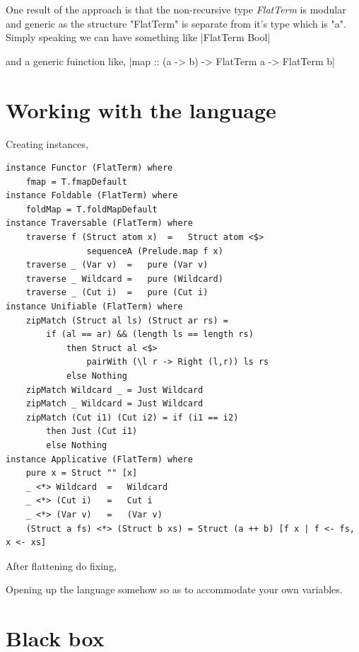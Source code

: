\documentclass[thesis-solanki.tex]{subfiles}
\begin{document}
One result of the approach is that the non-recursive type \textit{FlatTerm} is modular and generic as the structure "FlatTerm" is separate 
from it's type which is "a". Simply speaking we can have something like 
|FlatTerm Bool|

and a generic fuinction like,
|map :: (a -> b) -> FlatTerm a -> FlatTerm b|


\section{Working with the language}
Creating instances,
\begin{verbatim}
instance Functor (FlatTerm) where
	fmap = T.fmapDefault
instance Foldable (FlatTerm) where
 	foldMap = T.foldMapDefault
instance Traversable (FlatTerm) where
  	traverse f (Struct atom x)	=	Struct atom <$> 
  				sequenceA (Prelude.map f x)
  	traverse _ (Var v)	=	pure (Var v)
  	traverse _ Wildcard	=	pure (Wildcard)
  	traverse _ (Cut i)	= 	pure (Cut i)
instance Unifiable (FlatTerm) where
	zipMatch (Struct al ls) (Struct ar rs) = 
		if (al == ar) && (length ls == length rs) 
			then Struct al <$> 
				pairWith (\l r -> Right (l,r)) ls rs  		
			else Nothing
	zipMatch Wildcard _ = Just Wildcard
	zipMatch _ Wildcard = Just Wildcard
	zipMatch (Cut i1) (Cut i2) = if (i1 == i2) 
		then Just (Cut i1) 
		else Nothing
instance Applicative (FlatTerm) where
	pure x = Struct "" [x] 
	_ <*> Wildcard	= 	Wildcard
	_ <*> (Cut i) 	= 	Cut i
	_ <*> (Var v)	=	(Var v)
	(Struct a fs) <*> (Struct b xs) = Struct (a ++ b) [f x | f <- fs, x <- xs] 
\end{verbatim}

After flattening do fixing,
 

Opening up the language somehow so as to accommodate your own variables.







\section{Black box}
\end{document}

